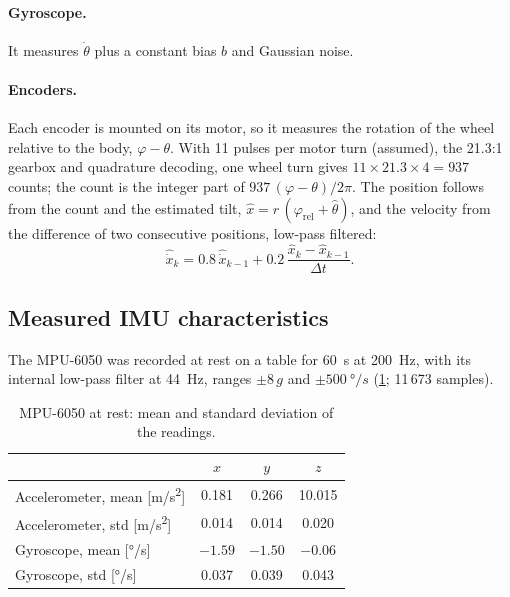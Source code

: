 \paragraph{Gyroscope.} It measures $\dot\theta$ plus a constant bias $b$ and
Gaussian noise.

\paragraph{Encoders.} Each encoder is mounted on its motor, so it measures the
rotation of the wheel relative to the body, $\varphi - \theta$. With 11 pulses
per motor turn (assumed), the 21.3:1 gearbox and quadrature decoding, one wheel turn
gives $11 \times 21.3 \times 4 = 937$ counts; the count is the integer part of
$937\,(\varphi - \theta)/2\pi$. The position follows from the count and the
estimated tilt, $\hat x = r\,(\varphi_{\mathrm{rel}} + \hat\theta)$, and the velocity
from the difference of two consecutive positions, low-pass filtered:
\begin{equation}
  \hat{\dot x}_{k} = 0.8\,\hat{\dot x}_{k-1} + 0.2\,\frac{\hat x_k - \hat x_{k-1}}{\Delta t} .
\end{equation}

\subsection{Measured IMU characteristics}

The MPU-6050 was recorded at rest on a table for \SI{60}{s} at \SI{200}{Hz},
with its internal low-pass filter at \SI{44}{Hz}, ranges $\pm 8\,g$ and
$\pm\SI{500}{\degree/s}$ (\cref{tab:imu}; 11\,673 samples).

\begin{table}[h]
\centering
\caption{MPU-6050 at rest: mean and standard deviation of the readings.}
\label{tab:imu}
\begin{tabular}{@{}lccc@{}}
\toprule
 & $x$ & $y$ & $z$ \\
\midrule
Accelerometer, mean [\si{m/s^2}] & 0.181 & 0.266 & 10.015 \\
Accelerometer, std [\si{m/s^2}] & 0.014 & 0.014 & 0.020 \\
Gyroscope, mean [\si{\degree/s}] & $-1.59$ & $-1.50$ & $-0.06$ \\
Gyroscope, std [\si{\degree/s}] & 0.037 & 0.039 & 0.043 \\
\bottomrule
\end{tabular}
\end{table}

